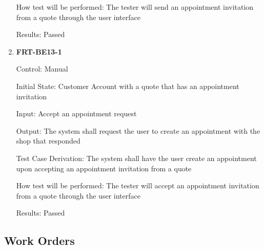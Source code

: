\documentclass[12pt, titlepage]{article}
\begin{document}
\begin{enumerate}
	      How test will be performed: The tester will send an appointment invitation from a quote through the
	      user interface

	      Results: Passed

	\item \textbf{FRT-BE13-1}

	      Control: Manual

	      Initial State: Customer Account with a quote that has an appointment invitation

	      Input: Accept an appointment request

	      Output: The system shall request the user to create an appointment with the shop that responded

	      Test Case Derivation: The system shall have the user create an appointment upon accepting an
	      appointment invitation from a quote

	      How test will be performed: The tester will accept an appointment invitation from a quote through
	      the user interface

	      Results: Passed

\end{enumerate}

\subsection{Work Orders}
\end{document}
